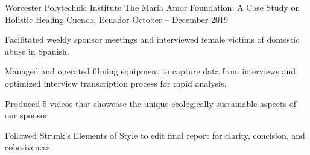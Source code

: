 \begin{cventries}
  \cventry
    {Worcester Polytechnic Institute} %
    {The Maria Amor Foundation: A Case Study on Holistic Healing} %
    {Cuenca, Ecuador} %
    {October – December 2019} %
    {
      \begin{cvitems} %
        \item {Facilitated weekly sponsor meetings and interviewed female victims of domestic abuse in Spanish.}
        \item {Managed and operated filming equipment to capture data from
        interviews and optimized interview transcription process for rapid analysis.}
        \item {Produced 5 videos that showcase the unique ecologically sustainable aspects of our sponsor.}
        \item {Followed
        Strunk’s Elements of Style to edit final report for clarity, concision, and cohesiveness.}
      \end{cvitems}
    }

\end{cventries}
